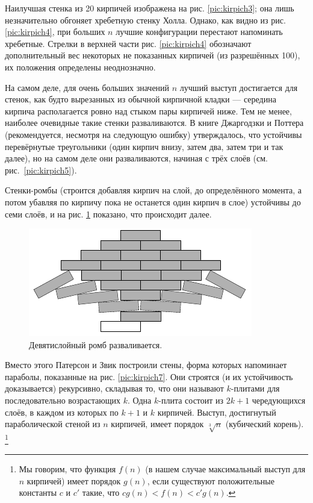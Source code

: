 Наилучшая стенка из 20 кирпичей изображена на рис. \ref{pic:kirpich3};
она лишь незначительно обгоняет хребетную стенку Холла.
Однако, как видно из рис. \ref{pic:kirpich4},  при больших $n$ лучшие конфигурации перестают напоминать хребетные.
Стрелки в верхней части рис. \ref{pic:kirpich4} обозначают дополнительный вес некоторых не показанных кирпичей (из разрешённых 100), их положения определены неоднозначно.

На самом деле, для очень больших значений $n$ лучший выступ достигается для стенок, как будто вырезанных из обычной кирпичной кладки --- середина кирпича располагается ровно над стыком пары кирпичей ниже.
Тем не менее, наиболее очевидные такие стенки разваливаются.
В книге Джаргодзки и Поттера \cite{38} (рекомендуется, несмотря на следующую ошибку) утверждалось, что устойчивы перевёрнутые треугольники (один кирпич внизу, затем два, затем три и так далее), но на самом деле они разваливаются, начиная с трёх слоёв (см. рис.~\ref{pic:kirpich5}).  

Стенки-ромбы (строится добавляя кирпич на слой, до определённого момента, а потом убавляя по кирпичу пока не останется один кирпич в слое) устойчивы до семи слоёв, и на рис. \ref{pic:kirpich6} показано, что происходит далее.

\begin{figure}[htb!]
\centering
\includegraphics[scale=1]{pics/kirpich6}
\caption{Девятислойный ромб разваливается.}
\label{pic:kirpich6}
\end{figure}

Вместо этого Патерсон и Звик построили стены, форма которых напоминает параболы, показанные на рис. \ref{pic:kirpich7}.
Они строятся (и их устойчивость доказывается) рекурсивно, складывая то, что они называют $k$-плитами для последовательно возрастающих $k$.
Одна $k$-плита состоит из $2k + 1$ чередующихся слоёв, в каждом из которых по $k + 1$ и $k$ кирпичей.
Выступ, достигнутый параболической стеной из $n$ кирпичей, имеет порядок $\sqrt[3]{n}$ (кубический корень).%
\footnote{Мы говорим, что функция $f (n)$ (в нашем случае максимальный выступ для $n$ кирпичей) имеет порядок $g(n)$, если существуют положительные константы $c$ и $c'$ такие, что $c g(n) < f (n) < c' g(n)$.}

